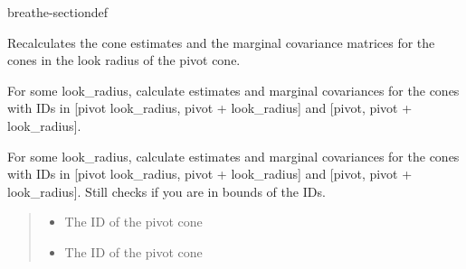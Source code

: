 \documentclass[letterpaper,10pt,english]{sphinxmanual}
\begin{document}
\begin{fulllineitems}
\begin{sphinxuseclass}{breathe-sectiondef}
\begin{fulllineitems}
\label{\detokenize{isam2:_CPPv4N4slam14SLAMEstAndMCov37update_and_recalculate_cone_proximityENSt6size_tE}}\label{\detokenize{isam2:_CPPv3N4slam14SLAMEstAndMCov37update_and_recalculate_cone_proximityENSt6size_tE}}\label{\detokenize{isam2:_CPPv2N4slam14SLAMEstAndMCov37update_and_recalculate_cone_proximityENSt6size_tE}}\label{\detokenize{isam2:slam::SLAMEstAndMCov::update_and_recalculate_cone_proximity__std::s}}
\pysigstartsignatures
\pysigstartmultiline
\pysiglinewithargsret
{\label{\detokenize{isam2:classslam_1_1SLAMEstAndMCov_1a70a19ef2eb1f9aa30b112d7993881fa1}}}
{}
{}
\pysigstopmultiline
\pysigstopsignatures
\sphinxAtStartPar
Recalculates the cone estimates and the marginal covariance matrices for the cones in the look radius of the pivot cone. 

\sphinxAtStartPar
For some look\_radius, calculate estimates and marginal covariances for the cones with IDs in {[}pivot \sphinxhyphen{} look\_radius, pivot + look\_radius{]} and {[}pivot, pivot + look\_radius{]}.

\sphinxAtStartPar

For some look\_radius, calculate estimates and marginal covariances for the cones with IDs in {[}pivot \sphinxhyphen{} look\_radius, pivot + look\_radius{]} and {[}pivot, pivot + look\_radius{]}. Still checks if you are in bounds of the IDs.
\begin{quote}\begin{description}
\begin{itemize}
\item {} 
\sphinxAtStartPar
{} \textendash{} The ID of the pivot cone

\item {} 
\sphinxAtStartPar
{} \textendash{} The ID of the pivot cone 

\end{itemize}

\end{description}\end{quote}

\end{fulllineitems}


\end{sphinxuseclass}
\end{fulllineitems}
\end{document}
